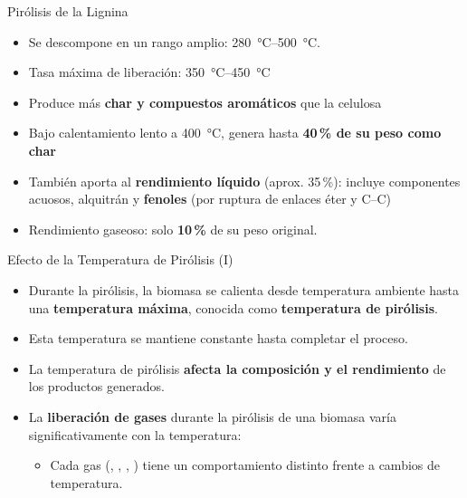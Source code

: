 \documentclass[../../main.tex]{subfiles}
\begin{document}
\begin{frame}{Pirólisis de la Lignina}
\small
\begin{itemize}
  \item Se descompone en un rango amplio: \SI{280}{\degreeCelsius}–\SI{500}{\degreeCelsius}.
  \item Tasa máxima de liberación: \SI{350}{\degreeCelsius}–\SI{450}{\degreeCelsius} %
  \item Produce más \textbf{char y compuestos aromáticos} que la celulosa %
  \item Bajo calentamiento lento a \SI{400}{\degreeCelsius}, genera hasta \textbf{40\,\% de su peso como char} %
  \item También aporta al \textbf{rendimiento líquido} (aprox. 35\,\%): incluye componentes acuosos, alquitrán y \textbf{fenoles} (por ruptura de enlaces éter y C–C) %
  \item Rendimiento gaseoso: solo \textbf{10\,\%} de su peso original.
\end{itemize}
\end{frame}


\begin{frame}{Efecto de la Temperatura de Pirólisis (I)}
\small
\begin{itemize}
  \item Durante la pirólisis, la biomasa se calienta desde temperatura ambiente hasta una \textbf{temperatura máxima}, conocida como \textbf{temperatura de pirólisis}.
  \item Esta temperatura se mantiene constante hasta completar el proceso.
  \item La temperatura de pirólisis \textbf{afecta la composición y el rendimiento} de los productos generados.
  \item La \textbf{liberación de gases} durante la pirólisis de una biomasa varía significativamente con la temperatura:
  \begin{itemize}
    \item Cada gas (, , , ) tiene un comportamiento distinto frente a cambios de temperatura.
  \end{itemize}
\end{itemize}
\end{frame}
\end{document}
